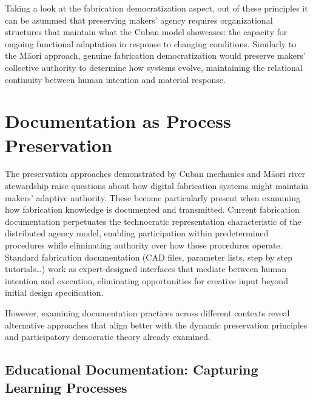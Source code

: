\vspace{0.5cm}

Taking a look at the fabrication democratization aspect, out of these principles it can be asummed that preserving makers' agency requires organizational structures that maintain what the Cuban model showcases: the capacity for ongoing functional adaptation in response to changing conditions. Similarly to the Māori approach, genuine fabrication democratization would preserve makers' collective authority to determine how systems evolve, maintaining the relational continuity between human intention and material response.

\section{Documentation as Process Preservation}

The preservation approaches demonstrated by Cuban mechanics and Māori river stewardship raise questions about how digital fabrication systems might maintain makers' adaptive authority. These become particularly present when examining how fabrication knowledge is documented and transmitted. Current fabrication documentation perpetuates the technocratic representation characteristic of the distributed agency model, enabling participation within predetermined procedures while eliminating authority over how those procedures operate. Standard fabrication documentation (CAD files, parameter lists, step by step tutorials\dots) work as expert-designed interfaces that mediate between human intention and execution, eliminating opportunities for creative input beyond initial design specification.

\vspace{0.5cm}

However, examining documentation practices across different contexts reveal alternative approaches that align better with the dynamic preservation principles and participatory democratic theory already examined.

\subsection{Educational Documentation: Capturing Learning Processes}

